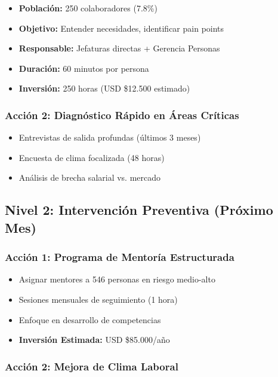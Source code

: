 \documentclass[11pt,a4paper,twoside]{article}
\begin{document}
\begin{itemize}
    \item \textbf{Población:} 250 colaboradores (7.8\%)
    \item \textbf{Objetivo:} Entender necesidades, identificar pain points
    \item \textbf{Responsable:} Jefaturas directas + Gerencia Personas
    \item \textbf{Duración:} 60 minutos por persona
    \item \textbf{Inversión:} 250 horas (USD \$12.500 estimado)
\end{itemize}

\subsubsection{Acción 2: Diagnóstico Rápido en Áreas Críticas}

\begin{itemize}
    \item Entrevistas de salida profundas (últimos 3 meses)
    \item Encuesta de clima focalizada (48 horas)
    \item Análisis de brecha salarial vs. mercado
\end{itemize}

\subsection{Nivel 2: Intervención Preventiva (Próximo Mes)}

\subsubsection{Acción 1: Programa de Mentoría Estructurada}

\begin{itemize}
    \item Asignar mentores a 546 personas en riesgo medio-alto
    \item Sesiones mensuales de seguimiento (1 hora)
    \item Enfoque en desarrollo de competencias
    \item \textbf{Inversión Estimada:} USD \$85.000/año
\end{itemize}

\subsubsection{Acción 2: Mejora de Clima Laboral}
\end{document}
